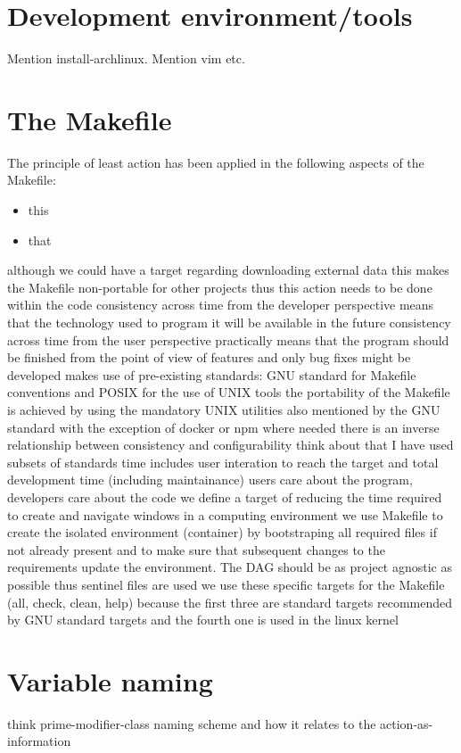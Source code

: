 \documentclass[journal]{IEEEtran}
\begin{document}
\section{Development environment/tools}
Mention install-archlinux.
Mention vim etc.

\section{The Makefile}
The principle of least action has been applied in the following aspects of the Makefile:
\begin{itemize}
	\item this
	\item that
\end{itemize}

although we could have a target regarding downloading external data this makes the Makefile non-portable for other projects thus this action needs to be done within the code
consistency across time from the developer perspective means that the technology used to program it will be available in the future
consistency across time from the user perspective practically means that the program should be finished from the point of view of features and only bug fixes might be developed
makes use of pre-existing standards: GNU standard for Makefile conventions and POSIX for the use of UNIX tools
the portability of the Makefile is achieved by using the mandatory UNIX utilities also mentioned by the GNU standard with the exception of docker or npm where needed
there is an inverse relationship between consistency and configurability
think about that I have used subsets of standards
time includes user interation to reach the target and total development time (including maintainance)
users care about the program, developers care about the code
we define a target of reducing the time required to create and navigate windows in a computing environment
we use Makefile to create the isolated environment (container) by bootstraping all required files if not already present and to make sure that subsequent changes to the requirements update the environment. The DAG should be as project agnostic as possible thus sentinel files are used
we use these specific targets for the Makefile (all, check, clean, help) because the first three are standard targets recommended by GNU standard targets and the fourth one is used in the linux kernel

\section{Variable naming}
think prime-modifier-class naming scheme and how it relates to the action-as-information
\end{document}
